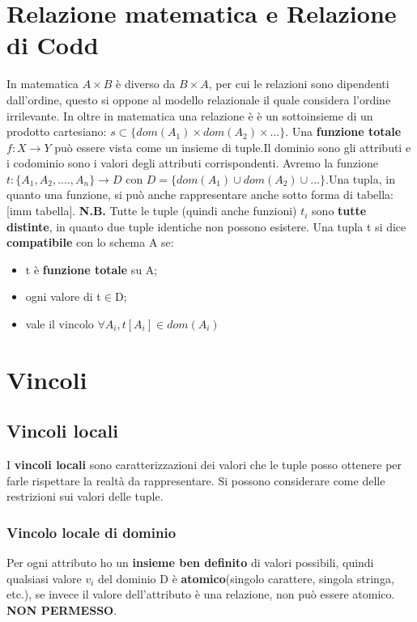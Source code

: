 \documentclass[10pt,twocolumn]{article}
\begin{document}
\section{Relazione matematica e Relazione di Codd}
In matematica $A\times B$ è diverso da $B\times A$, per cui le relazioni sono dipendenti dall'ordine, questo si oppone al modello relazionale il quale considera l'ordine irrilevante. In oltre in matematica una relazione è è un sottoinsieme di un prodotto cartesiano: $s \subset \{ dom(A_1)\times dom(A_2) \times ... \}$.  \newline Una \textbf{funzione totale} $f:X \rightarrow Y$ può essere vista come un insieme di tuple.\newline Il dominio sono gli attributi e i codominio sono i valori degli attributi corrispondenti. Avremo la funzione $t:\{ A_1,A_2,....,A_n\} \rightarrow D $ con $D = \{ dom(A_1)\cup dom(A_2) \cup ...\}$.\newline Una tupla, in quanto una funzione, si può anche rappresentare anche sotto forma di tabella: [imm tabella]. \newline \textbf{N.B.} Tutte le tuple (quindi anche funzioni) $t_i$ sono \textbf{tutte distinte}, in quanto due tuple identiche non possono esistere. \newline Una tupla t si dice \textbf{compatibile} con lo schema A se: \begin{itemize}
    \item t è \textbf{funzione totale} su A;
    \item ogni valore di t$\in$D;
    \item vale il vincolo $\forall A_i, t[A_i] \in dom(A_i)$
\end{itemize}
\section{Vincoli}
\subsection{Vincoli locali}
I \textbf{vincoli locali} sono caratterizzazioni dei valori che le tuple posso ottenere per farle rispettare la realtà da rappresentare. Si possono considerare come delle restrizioni sui valori delle tuple.
\subsubsection{Vincolo locale di dominio}
Per ogni attributo ho un \textbf{insieme ben definito} di valori possibili, quindi qualsiasi valore $v_i$ del dominio D è \textbf{atomico}(singolo carattere, singola stringa, etc.), se invece il valore dell'attributo è una relazione, non può essere atomico. \textbf{NON PERMESSO}.
\end{document}
